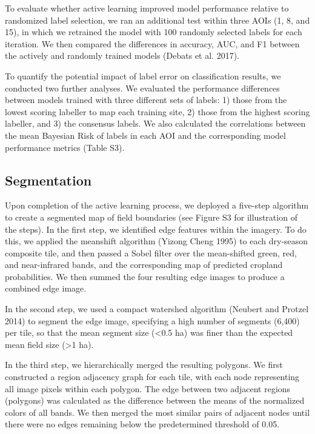 \documentclass[11pt,a4paper]{article}
\begin{document}
To evaluate whether active learning improved model performance relative
to randomized label selection, we ran an additional test within three
AOIs (1, 8, and 15), in which we retrained the model with 100 randomly
selected labels for each iteration. We then compared the differences in
accuracy, AUC, and F1 between the actively and randomly trained models
(Debats et al. 2017).

To quantify the potential impact of label error on classification
results, we conducted two further analyses. We evaluated the performance
differences between models trained with three different sets of labels:
1) those from the lowest scoring labeller to map each training site, 2)
those from the highest scoring labeller, and 3) the consensus labels. We
also calculated the correlations between the mean Bayesian Risk of
labels in each AOI and the corresponding model performance metrics
(Table S3).

\hypertarget{segmentation}{%
\subsection{Segmentation}\label{segmentation}}

Upon completion of the active learning process, we deployed a five-step
algorithm to create a segmented map of field boundaries (see Figure S3
for illustration of the steps). In the first step, we identified edge
features within the imagery. To do this, we applied the meanshift
algorithm (Yizong Cheng 1995) to each dry-season composite tile, and
then passed a Sobel filter over the mean-shifted green, red, and
near-infrared bands, and the corresponding map of predicted cropland
probabilities. We then summed the four resulting edge images to produce
a combined edge image.

In the second step, we used a compact watershed algorithm (Neubert and
Protzel 2014) to segment the edge image, specifying a high number of
segments (6,400) per tile, so that the mean segment size (\textless0.5
ha) was finer than the expected mean field size (\textgreater1 ha).

In the third step, we hierarchically merged the resulting polygons. We
first constructed a region adjacency graph for each tile, with each node
representing all image pixels within each polygon. The edge between two
adjacent regions (polygons) was calculated as the difference between the
means of the normalized colors of all bands. We then merged the most
similar pairs of adjacent nodes until there were no edges remaining
below the predetermined threshold of 0.05.
\end{document}
